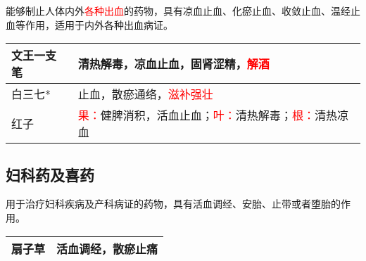 \documentclass[cn,hazy,blue,12pt,normal,founder]{elegantnote}
\newcommand{\redt}[1]{\textcolor{red}{{}#1}}      %
\begin{document}
能够制止人体内外\redt{各种出血}的药物，具有凉血止血、化瘀止血、收敛止血、温经止血等作用，适用于内外各种出血病证。

\begin{table}[H]
  \begin{tabular}{|l|l|}
  \hline
  文王一支笔 & 清热解毒，凉血止血，固肾涩精，\redt{解酒}    \\ \hline
  白三七* & 止血，散瘀通络，\redt{滋补强壮}   \\   \hline
  红子 & \redt{果：}健脾消积，活血止血；\redt{叶：}清热解毒；\redt{根：}清热凉血  \\  \hline
  \end{tabular}
\end{table}

\subsection{妇科药及喜药}

用于治疗妇科疾病及产科病证的药物，具有活血调经、安胎、止带或者堕胎的作用。

\begin{table}[H]
  \begin{tabular}{|l|l|}
  \hline
  扇子草 & 活血调经，散瘀止痛 \\ \hline
  \end{tabular}
\end{table}
\end{document}
